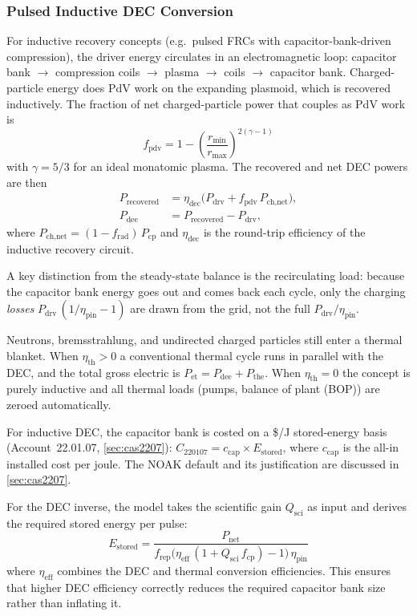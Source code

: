 \documentclass{article}
\begin{document}
\subsubsection{Pulsed Inductive DEC Conversion}
For inductive recovery concepts (e.g.\ pulsed FRCs with capacitor-bank-driven compression), the driver
energy circulates in an electromagnetic loop: capacitor bank $\to$
compression coils $\to$ plasma $\to$ coils $\to$ capacitor bank.
Charged-particle energy does PdV work on the expanding plasmoid,
which is recovered inductively.  The fraction of net charged-particle
power that couples as PdV work is
\begin{equation}
f_{\text{pdv}} = 1 - \left(\frac{r_{\min}}{r_{\max}}\right)^{\!2(\gamma-1)}
\end{equation}
with $\gamma = 5/3$ for an ideal monatomic plasma.  The recovered and
net DEC powers are then
\begin{align}
P_{\text{recovered}} &= \eta_{\text{dec}} \bigl(P_{\text{drv}}
  + f_{\text{pdv}} \, P_{\text{ch,net}}\bigr), \\
P_{\text{dee}} &= P_{\text{recovered}} - P_{\text{drv}},
\end{align}
where $P_{\text{ch,net}} = (1 - f_{\text{rad}})\,P_{\text{cp}}$
and $\eta_{\text{dec}}$ is the round-trip efficiency of the
inductive recovery circuit.

A key distinction from the steady-state balance is the recirculating
load: because the capacitor bank energy goes out and comes back each
cycle, only the charging \emph{losses}
$P_{\text{drv}}\,(1/\eta_{\text{pin}} - 1)$ are drawn from the grid,
not the full $P_{\text{drv}}/\eta_{\text{pin}}$.

Neutrons, bremsstrahlung, and undirected charged particles still enter
a thermal blanket.  When $\eta_{\text{th}} > 0$ a conventional thermal
cycle runs in parallel with the DEC, and the total gross electric is
$P_{\text{et}} = P_{\text{dee}} + P_{\text{the}}$.  When
$\eta_{\text{th}} = 0$ the concept is purely inductive and all
thermal loads (pumps, balance of plant (BOP)) are zeroed automatically.

For inductive DEC, the capacitor bank is costed on a \$/J stored-energy
basis (Account~22.01.07, \cref{sec:cas2207}): $C_{220107} = c_{\text{cap}}
\times E_{\text{stored}}$, where $c_{\text{cap}}$ is the all-in installed
cost per joule.  The NOAK default and its justification are discussed in
\cref{sec:cas2207}.

For the DEC inverse, the model takes the scientific gain $Q_{\text{sci}}$
as input and derives the required stored energy per pulse:
\begin{equation}
E_{\text{stored}} = \frac{P_{\text{net}}}{f_{\text{rep}} \bigl(
  \eta_{\text{eff}}\,(1 + Q_{\text{sci}}\,f_{\text{cp}}) - 1 \bigr)
  \,\eta_{\text{pin}}}
\end{equation}
where $\eta_{\text{eff}}$ combines the DEC and thermal conversion
efficiencies.  This ensures that higher DEC efficiency correctly reduces
the required capacitor bank size rather than inflating it.
\end{document}
